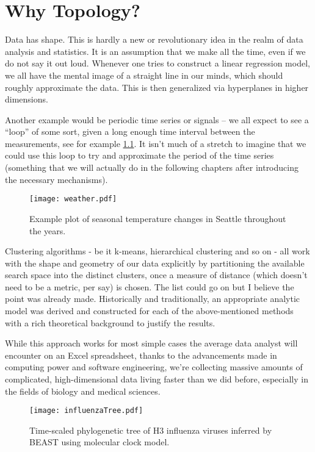 \chapter{Why Topology?}
\graphicspath{ {/home/tomasp/Dokumenty/Master_Thesis/figures/} }

Data has shape. This is hardly a new or revolutionary idea in the realm of data analysis and statistics. It is an assumption that we make all the time, even if we do not say it out loud. Whenever one tries to construct a linear regression model, we all have the mental image of a straight line in our minds, which should roughly approximate the data. This is then generalized via hyperplanes in higher dimensions.
\par
Another example would be periodic time series or signals -- we all expect to see a ``loop'' of some sort, given a long enough time interval between the measurements, see for example \ref{fig:SeattleWeather}. It isn't much of a stretch to imagine that we could use this loop to try and approximate the period of the time series (something that we will actually do in the following chapters after introducing the necessary mechanisms).

\begin{figure}[h]
  \caption{Example plot of seasonal temperature changes in Seattle throughout the years.}
  \texttt{[image: weather.pdf]}
  \centering
  \label{fig:SeattleWeather}
\end{figure}

Clustering algorithms - be it k-means, hierarchical clustering and so on - all work with the shape and geometry of our data explicitly by partitioning the available search space into the distinct clusters, once a measure of distance (which doesn't need to be a metric, per say) is chosen. The list could go on but I believe the point was already made. Historically and traditionally, an appropriate analytic model was derived and constructed for each of the above-mentioned methods with a rich theoretical background to justify the results.
\par
While this approach works for most simple cases the average data analyst will encounter on an Excel spreadsheet, thanks to the advancements made in computing power and software engineering, we're collecting massive amounts of complicated, high-dimensional data living faster than we did before, especially in the fields of biology and medical sciences.

\begin{figure}[h]
  \caption{Time-scaled phylogenetic tree of H3 influenza viruses inferred by BEAST using molecular clock model.}
  \texttt{[image: influenzaTree.pdf]}
  \centering
  \label{fig:influenzaTree}
\end{figure}

